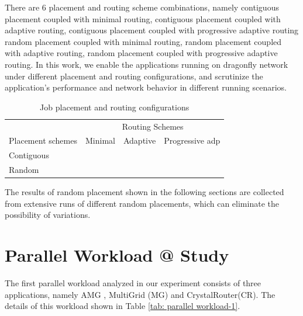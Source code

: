 \documentclass[conference,compsoc]{IEEEtran}
\makeatletter
\newcommand{\Rmnum}[1]{\expandafter\@slowromancap\romannumeral #1@}
\makeatother
\begin{document}
There are 6 placement and routing scheme combinations, namely contiguous placement coupled with minimal routing, contiguous placement coupled with adaptive routing, contiguous placement coupled with progressive adaptive routing random placement coupled with minimal routing, random placement coupled with adaptive routing, random placement coupled with progressive adaptive routing.  In this work, we enable the applications running on dragonfly network under different placement and routing configurations, and scrutinize the application's performance and network behavior in different running scenarios. 

\begin{table}[ht]
\begin{center}
\caption{Job placement and routing configurations} 
\label{tab: placement routing configs}
\begin{tabular}{l c c c }
\toprule %
\toprule
&\multicolumn{3}{c}{Routing Schemes} \\ %
\cmidrule(l){2-4}
Placement schemes & Minimal & Adaptive & Progressive adp\\ %
\midrule %
Contiguous  &     &      &     \\ %
\midrule
Random  &     &      &     \\ 

\midrule %
\bottomrule %
\end{tabular}
\end{center}
\end{table}

The results of random placement shown in the following sections are collected from extensive runs of different random placements, which can eliminate the possibility of variations.

\section{Parallel Workload \Rmnum{1 } Study}
\label{sec: workload 1 overview}

The first parallel workload analyzed in our experiment consists of three applications, namely AMG , MultiGrid (MG) and CrystalRouter(CR). The details of this workload shown in Table \ref{tab: parallel workload-1}.
\end{document}
